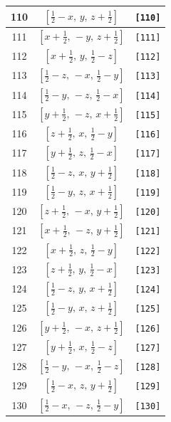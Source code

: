 \documentclass[fleqn,8pt]{jsarticle}
\begin{document}
\begin{longtable}{ccc}
110 & $\left[ \frac{1}{2} - x,\, y,\, z + \frac{1}{2} \right]$ & {\tt [110]} \\ \hline
111 & $\left[ x + \frac{1}{2},\, - y,\, z + \frac{1}{2} \right]$ & {\tt [111]} \\ \hline
112 & $\left[ x + \frac{1}{2},\, y,\, \frac{1}{2} - z \right]$ & {\tt [112]} \\ \hline
113 & $\left[ \frac{1}{2} - z,\, - x,\, \frac{1}{2} - y \right]$ & {\tt [113]} \\ \hline
114 & $\left[ \frac{1}{2} - y,\, - z,\, \frac{1}{2} - x \right]$ & {\tt [114]} \\ \hline
115 & $\left[ y + \frac{1}{2},\, - z,\, x + \frac{1}{2} \right]$ & {\tt [115]} \\ \hline
116 & $\left[ z + \frac{1}{2},\, x,\, \frac{1}{2} - y \right]$ & {\tt [116]} \\ \hline
117 & $\left[ y + \frac{1}{2},\, z,\, \frac{1}{2} - x \right]$ & {\tt [117]} \\ \hline
118 & $\left[ \frac{1}{2} - z,\, x,\, y + \frac{1}{2} \right]$ & {\tt [118]} \\ \hline
119 & $\left[ \frac{1}{2} - y,\, z,\, x + \frac{1}{2} \right]$ & {\tt [119]} \\ \hline
120 & $\left[ z + \frac{1}{2},\, - x,\, y + \frac{1}{2} \right]$ & {\tt [120]} \\ \hline
121 & $\left[ x + \frac{1}{2},\, - z,\, y + \frac{1}{2} \right]$ & {\tt [121]} \\ \hline
122 & $\left[ x + \frac{1}{2},\, z,\, \frac{1}{2} - y \right]$ & {\tt [122]} \\ \hline
123 & $\left[ z + \frac{1}{2},\, y,\, \frac{1}{2} - x \right]$ & {\tt [123]} \\ \hline
124 & $\left[ \frac{1}{2} - z,\, y,\, x + \frac{1}{2} \right]$ & {\tt [124]} \\ \hline
125 & $\left[ \frac{1}{2} - y,\, x,\, z + \frac{1}{2} \right]$ & {\tt [125]} \\ \hline
126 & $\left[ y + \frac{1}{2},\, - x,\, z + \frac{1}{2} \right]$ & {\tt [126]} \\ \hline
127 & $\left[ y + \frac{1}{2},\, x,\, \frac{1}{2} - z \right]$ & {\tt [127]} \\ \hline
128 & $\left[ \frac{1}{2} - y,\, - x,\, \frac{1}{2} - z \right]$ & {\tt [128]} \\ \hline
129 & $\left[ \frac{1}{2} - x,\, z,\, y + \frac{1}{2} \right]$ & {\tt [129]} \\ \hline
130 & $\left[ \frac{1}{2} - x,\, - z,\, \frac{1}{2} - y \right]$ & {\tt [130]} \\ \hline

\end{longtable}
\end{document}
